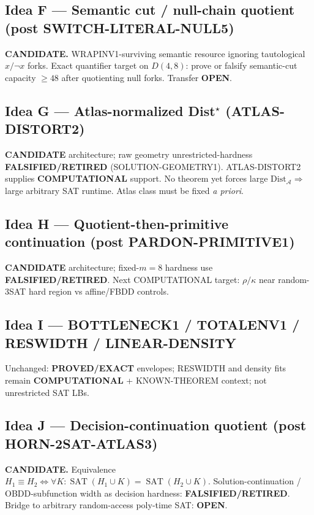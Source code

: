 \documentclass[11pt]{article}
\begin{document}
\subsection*{Idea F --- Semantic cut / null-chain quotient (post SWITCH-LITERAL-NULL5)}
\textbf{CANDIDATE.} WRAPINV1-surviving semantic resource ignoring tautological $x/\neg x$
forks. Exact quantifier target on $D(4,8)$: prove or falsify semantic-cut capacity $\ge 48$
after quotienting null forks. Transfer \textbf{OPEN}.

\subsection*{Idea G --- Atlas-normalized Dist$^\star$ (ATLAS-DISTORT2)}
\textbf{CANDIDATE} architecture; raw geometry unrestricted-hardness
\textbf{FALSIFIED/RETIRED} (SOLUTION-GEOMETRY1).
ATLAS-DISTORT2 supplies \textbf{COMPUTATIONAL} support. No theorem yet forces large
$\mathrm{Dist}_{\mathcal A}\Rightarrow$ large arbitrary SAT runtime.
Atlas class must be fixed \emph{a priori}.

\subsection*{Idea H --- Quotient-then-primitive continuation (post PARDON-PRIMITIVE1)}
\textbf{CANDIDATE} architecture; fixed-$m=8$ hardness use \textbf{FALSIFIED/RETIRED}.
Next COMPUTATIONAL target: $\rho/\kappa$ near random-3SAT hard region vs affine/FBDD controls.

\subsection*{Idea I --- BOTTLENECK1 / TOTALENV1 / RESWIDTH / LINEAR-DENSITY}
Unchanged: \textbf{PROVED/EXACT} envelopes; RESWIDTH and density fits remain
\textbf{COMPUTATIONAL} + KNOWN-THEOREM context; not unrestricted SAT LBs.

\subsection*{Idea J --- Decision-continuation quotient (post HORN-2SAT-ATLAS3)}
\textbf{CANDIDATE.} Equivalence
$H_1\equiv H_2\iff\forall K:\operatorname{SAT}(H_1\cup K)=\operatorname{SAT}(H_2\cup K)$.
Solution-continuation / OBDD-subfunction width as decision hardness:
\textbf{FALSIFIED/RETIRED}. Bridge to arbitrary random-access poly-time SAT: \textbf{OPEN}.
\end{document}
